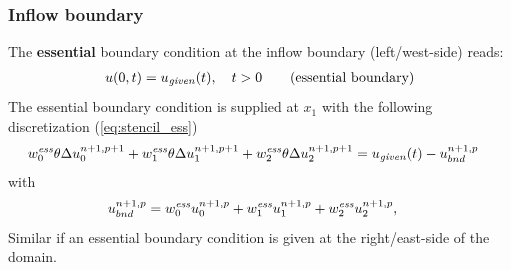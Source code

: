 \subsubsection{Inflow boundary}
The \textbf{essential} boundary condition at the inflow boundary (left/west-side) reads:
\begin{align}
    u(0,t) = u_{\it given}(t), \quad t > 0 \qquad \text{(essential boundary)}
\end{align}
The essential boundary condition is supplied at $x_1$ with the following discretization (\autoref{eq:stencil_ess})
\begin{align}
    & w^{\it ess}_0 \theta  \Delta u^{n+1,p+1}_0 +
    w^{\it ess}_1 \theta  \Delta u^{n+1,p+1}_1 +
    w^{\it ess}_2 \theta  \Delta u^{n+1,p+1}_2
    =  u_{\it given}(t) - u^{n+1,p}_{bnd}
\end{align}
with
\begin{align}
    u^{n+1,p}_{bnd} & = w^{\it ess}_0 u^{n+1,p}_0
    + w^{\it ess}_1 u^{n+1,p}_1
    + w^{\it ess}_2 u^{n+1,p}_2,
\end{align}
Similar if an essential boundary condition is given at the right/east-side of the domain.
%
